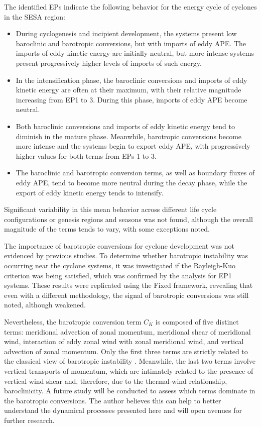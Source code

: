 The identified EPs indicate the following behavior for the energy cycle of cyclones in the SESA region:

\begin{itemize}
    \item During cyclogenesis and incipient development, the systems present low baroclinic and barotropic conversions, but with imports of eddy APE. The imports of eddy kinetic energy are initially neutral, but more intense systems present progressively higher levels of imports of such energy.
    \item In the intensification phase, the baroclinic conversions and imports of eddy kinetic energy are often at their maximum, with their relative magnitude increasing from EP1 to 3. During this phase, imports of eddy APE become neutral.
    \item Both baroclinic conversions and imports of eddy kinetic energy tend to diminish in the mature phase. Meanwhile, barotropic conversions become more intense and the systems begin to export eddy APE, with progressively higher values for both terms from EPs 1 to 3.
    \item The baroclinic and barotropic conversion terms, as well as boundary fluxes of eddy APE, tend to become more neutral during the decay phase, while the export of eddy kinetic energy tends to intensify.
\end{itemize}

Significant variability in this mean behavior across different life cycle configurations or genesis regions and seasons was not found, although the overall magnitude of the terms tends to vary, with some exceptions noted.

The importance of barotropic conversions for cyclone development was not evidenced by previous studies. To determine whether barotropic instability was occurring near the cyclone systems, it was investigated if the Rayleigh-Kuo criterion was being satisfied, which was confirmed by the analysis for EP1 systems. These results were replicated using the Fixed framework, revealing that even with a different methodology, the signal of barotropic conversions was still noted, although weakened.

Nevertheless, the barotropic conversion term $C_K$ is composed of five distinct terms: meridional advection of zonal momentum, meridional shear of meridional wind, interaction of eddy zonal wind with zonal meridional wind, and vertical advection of zonal momentum. Only the first three terms are strictly related to the classical view of barotropic instability \citep{rayleigh1895stability,kuo1949dynamic,holton1973introduction}. Meanwhile, the last two terms involve vertical transports of momentum, which are intimately related to the presence of vertical wind shear and, therefore, due to the thermal-wind relationship, baroclinicity. A future study will be conducted to assess which terms dominate in the barotropic conversions. The author believes this can help to better understand the dynamical processes presented here and will open avenues for further research.

